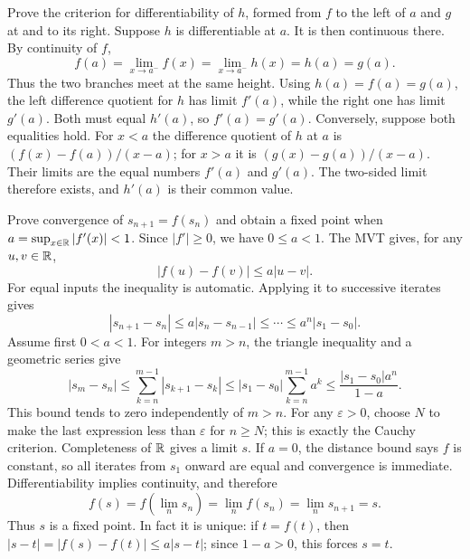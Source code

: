 \goal Prove the criterion for differentiability of $h$, formed from $f$ to the left of $a$ and $g$ at and to its right.
Suppose $h$ is differentiable at $a$. It is then continuous there. By continuity of $f$,
\[
 f(a)=\lim_{x\to a^-}f(x)=\lim_{x\to a^-}h(x)=h(a)=g(a).
\]
Thus the two branches meet at the same height.
Using $h(a)=f(a)=g(a)$, the left difference quotient for $h$ has limit $f'(a)$, while the right one has limit $g'(a)$. Both must equal $h'(a)$, so $f'(a)=g'(a)$.
Conversely, suppose both equalities hold. For $x<a$ the difference quotient of $h$ at $a$ is $(f(x)-f(a))/(x-a)$; for $x>a$ it is $(g(x)-g(a))/(x-a)$. Their limits are the equal numbers $f'(a)$ and $g'(a)$. The two-sided limit therefore exists, and $h'(a)$ is their common value.

\goal Prove convergence of $s_{n+1}=f(s_n)$ and obtain a fixed point when $a=\sup_{x\in\mathbb{R}}|f'(x)|<1$.
Since $|f'|\ge0$, we have $0\le a<1$. The MVT gives, for any $u,v\in\mathbb{R}$,
\[
 |f(u)-f(v)|\le a|u-v|.
\]
For equal inputs the inequality is automatic. Applying it to successive iterates gives
\[
 |s_{n+1}-s_n|\le a|s_n-s_{n-1}|\le\cdots\le a^n|s_1-s_0|.
\]
Assume first $0<a<1$. For integers $m>n$, the triangle inequality and a geometric series give
\[
 |s_m-s_n|\le\sum_{k=n}^{m-1}|s_{k+1}-s_k|
 \le |s_1-s_0|\sum_{k=n}^{m-1}a^k
 \le\frac{|s_1-s_0|a^n}{1-a}.
\]
This bound tends to zero independently of $m>n$. For any $\varepsilon>0$, choose $N$ to make the last expression less than $\varepsilon$ for $n\ge N$; this is exactly the Cauchy criterion. Completeness of $\mathbb{R}$ gives a limit $s$. If $a=0$, the distance bound says $f$ is constant, so all iterates from $s_1$ onward are equal and convergence is immediate.
Differentiability implies continuity, and therefore
\[
 f(s)=f\left(\lim_n s_n\right)=\lim_n f(s_n)
 =\lim_n s_{n+1}=s.
\]
Thus $s$ is a fixed point. In fact it is unique: if $t=f(t)$, then $|s-t|=|f(s)-f(t)|\le a|s-t|$; since $1-a>0$, this forces $s=t$.
